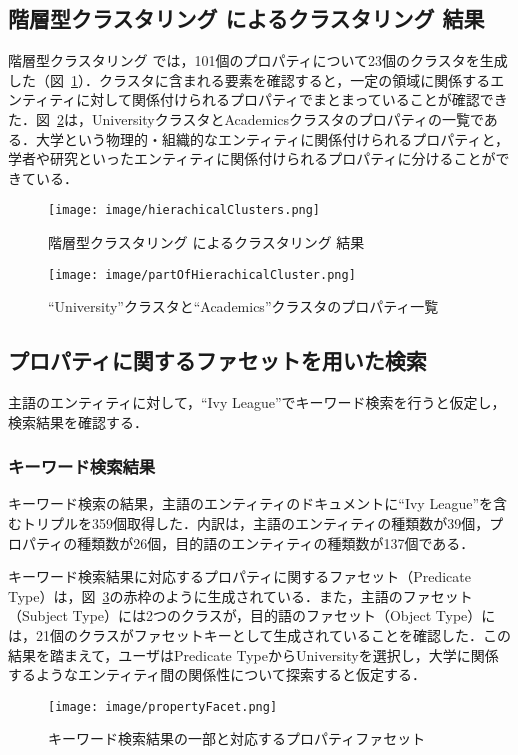 \subsection{階層型クラスタリング によるクラスタリング 結果}
\label{sec:hierachicalClustersResult}
階層型クラスタリング では，101個のプロパティについて23個のクラスタを生成した（図~\ref{fig:hierachicalClusters}）．クラスタに含まれる要素を確認すると，一定の領域に関係するエンティティに対して関係付けられるプロパティでまとまっていることが確認できた．図~\ref{fig:partOfHierachicalCluster}は，UniversityクラスタとAcademicsクラスタのプロパティの一覧である．大学という物理的・組織的なエンティティに関係付けられるプロパティと，学者や研究といったエンティティに関係付けられるプロパティに分けることができている．
%
\begin{figure}[h]
\centering
\texttt{[image: image/hierachicalClusters.png]}
\caption{\small
階層型クラスタリング によるクラスタリング 結果
}
\label{fig:hierachicalClusters}
\end{figure}
%
\begin{figure}[h]
\centering
\texttt{[image: image/partOfHierachicalCluster.png]}
\caption{\small
``University''クラスタと``Academics''クラスタのプロパティ一覧
}
\label{fig:partOfHierachicalCluster}
\end{figure}
%
\subsection{プロパティに関するファセットを用いた検索}
主語のエンティティに対して，``Ivy League''でキーワード検索を行うと仮定し，検索結果を確認する．

\subsubsection{キーワード検索結果}
キーワード検索の結果，主語のエンティティのドキュメントに``Ivy League''を含むトリプルを359個取得した．内訳は，主語のエンティティの種類数が39個，プロパティの種類数が26個，目的語のエンティティの種類数が137個である．

キーワード検索結果に対応するプロパティに関するファセット（Predicate Type）は，図~\ref{fig:propertyFacet}の赤枠のように生成されている．また，主語のファセット（Subject Type）には2つのクラスが，目的語のファセット（Object Type）には，21個のクラスがファセットキーとして生成されていることを確認した．この結果を踏まえて，ユーザはPredicate TypeからUniversityを選択し，大学に関係するようなエンティティ間の関係性について探索すると仮定する．
%
\begin{figure}[h]
\centering
\texttt{[image: image/propertyFacet.png]}
\caption{\small
キーワード検索結果の一部と対応するプロパティファセット
}
\label{fig:propertyFacet}
\end{figure}
%
